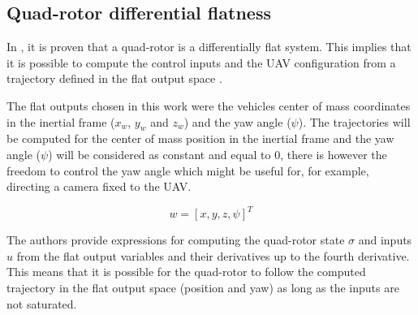 \subsection{Quad-rotor differential flatness}
 
  In \cite{ref:mellingerFlat}, it is proven that a quad-rotor is a differentially flat system. This implies that it is possible to compute the control inputs and the UAV configuration from a trajectory defined in the flat output space \cite{ref:diffFlat}.
 
 The flat outputs chosen in this work were the vehicles center of mass coordinates in the inertial frame ($x_w$, $y_w$ and $z_w$) and the yaw angle ($\psi$). The trajectories will be computed for the center of mass position in the inertial frame and the yaw angle ($\psi$) will be considered as constant and equal to 0, there is however the freedom to control the yaw angle which might be useful for, for example, directing a camera fixed to the UAV.
 
 \begin{equation}
     w = \left [ x, y, z, \psi \right ]^T
 \end{equation}
 
 The authors provide expressions for computing the quad-rotor state $\sigma$ and inputs $u$ from the flat output variables and their derivatives up to the fourth derivative. This means that it is possible for the quad-rotor to follow the computed trajectory in the flat output space (position and yaw) as long as the inputs are not saturated.

